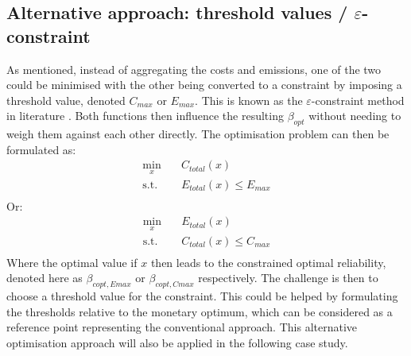 \subsection{Alternative approach: threshold values / $\varepsilon$-constraint}
As mentioned, instead of aggregating the costs and emissions, one of the two could be minimised with the other being converted to a constraint by imposing a threshold value, denoted $C_{max}$ or $E_{max}$.
This is known as the $\varepsilon$-constraint method in literature \citep{Deb2001Multi-objectiveAlgorithms}.
Both functions then influence the resulting $\beta_{opt}$ without needing to weigh them against each other directly.
The optimisation problem can then be formulated as:
\begin{equation}
    \begin{aligned}
        \min_{x} \quad & C_{total}(x)\\
        \textrm{s.t.} \quad & E_{total}(x) \leq E_{max}\\
    \end{aligned}
\end{equation}
Or:
\begin{equation}
    \begin{aligned}
        \min_{x} \quad & E_{total}(x)\\
        \textrm{s.t.} \quad & C_{total}(x) \leq C_{max}\\
    \end{aligned}
\end{equation}
Where the optimal value if $x$ then leads to the constrained optimal reliability, denoted here as $\beta_{copt,Emax}$ or $\beta_{copt,Cmax}$ respectively.
The challenge is then to choose a threshold value for the constraint.
This could be helped by formulating the thresholds relative to the monetary optimum, which can be considered as a reference point representing the conventional approach.
This alternative optimisation approach will also be applied in the following case study.

